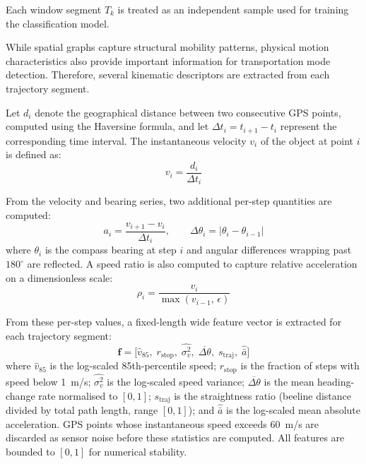 \documentclass[conference]{IEEEtran}
\begin{document}
Each window segment $T_k$ is treated as an independent sample used for training the classification model.


While spatial graphs capture structural mobility patterns, physical motion characteristics also provide important information for transportation mode detection. Therefore, several kinematic descriptors are extracted from each trajectory segment.

Let $d_i$ denote the geographical distance between two consecutive GPS points, computed using the Haversine formula, and let $\Delta t_i = t_{i+1} - t_i$ represent the corresponding time interval. The instantaneous velocity $v_i$ of the object at point $i$ is defined as:
\begin{equation}
v_i = \frac{d_i}{\Delta t_i}
\end{equation}

From the velocity and bearing series, two additional per-step quantities are computed:
\begin{equation}
a_i = \frac{v_{i+1} - v_i}{\Delta t_i}, \qquad \Delta\theta_i = |\theta_i - \theta_{i-1}|
\end{equation}
where $\theta_i$ is the compass bearing at step $i$ and angular differences wrapping past $180^\circ$ are reflected. A speed ratio is also computed to capture relative acceleration on a dimensionless scale:
\begin{equation}
\rho_i = \frac{v_i}{\max(v_{i-1},\,\epsilon)}
\end{equation}

From these per-step values, a fixed-length wide feature vector is extracted for each trajectory segment:
\begin{equation}
\mathbf{f} = \bigl[\hat{v}_{85},\; r_{\text{stop}},\; \widehat{\sigma^2_v},\; \overline{\Delta\theta},\; s_{\text{traj}},\; \hat{\bar{a}}\bigr]
\end{equation}
where $\hat{v}_{85}$ is the log-scaled 85th-percentile speed; $r_{\text{stop}}$ is the fraction of steps with speed below 1~m/s; $\widehat{\sigma^2_v}$ is the log-scaled speed variance; $\overline{\Delta\theta}$ is the mean heading-change rate normalised to $[0,1]$; $s_{\text{traj}}$ is the straightness ratio (beeline distance divided by total path length, range $[0,1]$); and $\hat{\bar{a}}$ is the log-scaled mean absolute acceleration. GPS points whose instantaneous speed exceeds 60~m/s are discarded as sensor noise before these statistics are computed. All features are bounded to $[0,1]$ for numerical stability.
\end{document}
